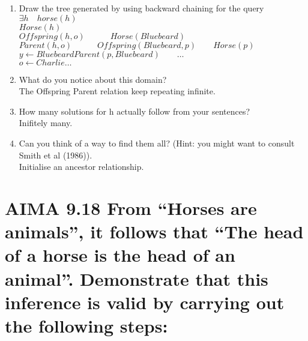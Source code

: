 \documentclass{scrartcl}
\begin{document}
\begin{enumerate}[label={\alph*)}] 
	\item Draw the tree generated by using backward chaining for the query $\exists h \quad horse(h)$\\
	$Horse(h)$\\
	$Offspring(h, o)\quad\quad\quad Horse(Bluebeard)$\\
	$Parent(h, o)\quad\quad\quad Offspring(Bluebeard, p) \quad \quad Horse(p)$\\
	$y\gets Bluebeard$\quad\quad$Parent(p, Bluebeard)\quad \quad \dots$\\
	$o\gets Charlie$\quad\quad$\dots$\\
	
	\item What do you notice about this domain?\\
	The Offspring Parent relation keep repeating infinite.

	\item How many solutions for h actually follow from your sentences?\\
	Inifitely many.

	\item Can you think of a way to find them all? (Hint: you might want to consult Smith et al (1986)).\\
	Initialise an ancestor relationship.


\end{enumerate}


\section{ AIMA 9.18 From “Horses are animals”, it follows that “The head of a horse is the head of an animal”. Demonstrate that this inference is valid by carrying out the following steps: }
\end{document}
